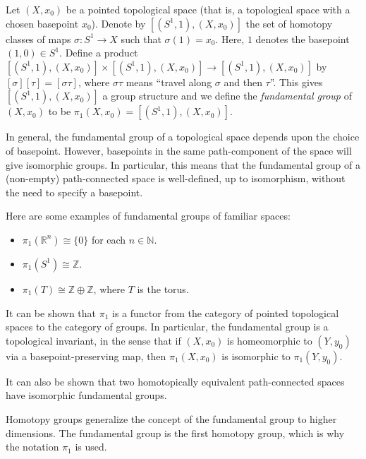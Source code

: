\documentclass{article}
\def\R{\mathbb{R}}
\def\N{\mathbb{N}}
\begin{document}

Let $(X,x_{0})$ be a pointed topological space (that is, a topological space with a chosen basepoint $x_{0}$).
Denote by $[(S^1,1),(X,x_{0})]$
the set of homotopy classes of maps $\sigma\colon S^{1} \to X$
such that $\sigma(1)=x_{0}$.
Here, $1$ denotes the basepoint $(1,0) \in S^{1}$.
Define a product
$[(S^1,1),(X,x_{0})] \times [(S^1,1),(X,x_{0})] \to [(S^1,1),(X,x_{0})]$
by $[\sigma][\tau]=[\sigma\tau]$,
where $\sigma\tau$ means ``travel along $\sigma$ and then $\tau$''.
This gives $[(S^1,1),(X,x_{0})]$ a group structure
and we define the \emph{fundamental group} of $(X,x_0)$
to be $\pi_1(X,x_{0})= [(S^1,1),(X,x_{0})]$.

In general, the fundamental group of a topological space
depends upon the choice of basepoint.
However, basepoints in the same path-component of the space
will give isomorphic groups.
In particular, this means that the fundamental group of a (non-empty) path-connected space is well-defined, up to isomorphism,
without the need to specify a basepoint.

Here are some examples of fundamental groups of familiar spaces: 
\begin{itemize}
\item $\pi_1(\R^n)\cong\{0\}$ for each $n\in\N$.
\item $\pi_1(S^1)\cong\mathbb{Z}$.
\item $\pi_1(T)\cong \mathbb{Z}\oplus\mathbb{Z}$, where $T$ is the torus.
\end{itemize}

It can be shown that $\pi_1$ is a functor
from the category of pointed topological spaces to the category of groups.
In particular, the fundamental group is a topological invariant,
in the sense that
if $(X,x_0)$ is homeomorphic to $(Y,y_0)$ via a basepoint-preserving map,
then $\pi_1(X,x_0)$ is isomorphic to $\pi_1(Y,y_{0})$. 

It can also be shown that two homotopically equivalent path-connected spaces
have isomorphic fundamental groups.

Homotopy groups generalize the concept of the fundamental group to higher dimensions.
The fundamental group is the first homotopy group,
which is why the notation $\pi_1$ is used.
\end{document}
